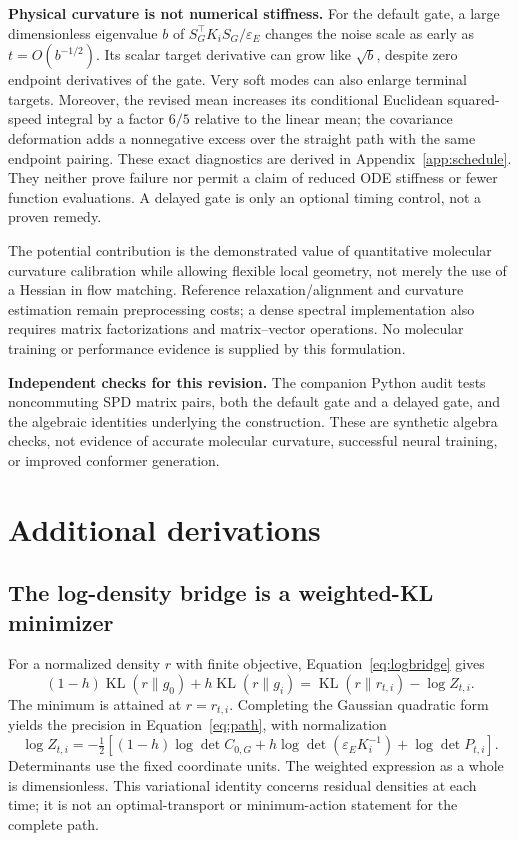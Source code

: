 \documentclass[11pt,letterpaper]{article}
\newcommand{\epsE}{\varepsilon_E}
\newcommand{\KL}{\operatorname{KL}}
\begin{document}
\textbf{Physical curvature is not numerical stiffness.} For the default gate, a large dimensionless eigenvalue $b$ of $S_G^\top K_iS_G/\epsE$ changes the noise scale as early as $t=O(b^{-1/2})$. Its scalar target derivative can grow like $\sqrt b$, despite zero endpoint derivatives of the gate. Very soft modes can also enlarge terminal targets. Moreover, the revised mean increases its conditional Euclidean squared-speed integral by a factor $6/5$ relative to the linear mean; the covariance deformation adds a nonnegative excess over the straight path with the same endpoint pairing. These exact diagnostics are derived in Appendix~\ref{app:schedule}. They neither prove failure nor permit a claim of reduced ODE stiffness or fewer function evaluations. A delayed gate is only an optional timing control, not a proven remedy.

The potential contribution is the demonstrated value of quantitative molecular curvature calibration while allowing flexible local geometry, not merely the use of a Hessian in flow matching. Reference relaxation/alignment and curvature estimation remain preprocessing costs; a dense spectral implementation also requires matrix factorizations and matrix--vector operations. No molecular training or performance evidence is supplied by this formulation.

\textbf{Independent checks for this revision.} The companion Python audit tests noncommuting SPD matrix pairs, both the default gate and a delayed gate, and the algebraic identities underlying the construction. These are synthetic algebra checks, not evidence of accurate molecular curvature, successful neural training, or improved conformer generation.

\appendix
\section{Additional derivations}

\subsection{The log-density bridge is a weighted-KL minimizer}\label{app:kl}
For a normalized density $r$ with finite objective, Equation~\eqref{eq:logbridge} gives
\begin{equation}\label{eq:klproof}
(1-h)\KL(r\|g_0)+h\KL(r\|g_i)
=\KL(r\|r_{t,i})-\log Z_{t,i}.
\end{equation}
The minimum is attained at $r=r_{t,i}$. Completing the Gaussian quadratic form yields the precision in Equation~\eqref{eq:path}, with normalization
\begin{equation}\label{eq:logz}
\log Z_{t,i}=-\tfrac12\left[(1-h)\log\det C_{0,G}
+h\log\det(\epsE K_i^{-1})+\log\det P_{t,i}\right].
\end{equation}
Determinants use the fixed coordinate units. The weighted expression as a whole is dimensionless. This variational identity concerns residual densities at each time; it is not an optimal-transport or minimum-action statement for the complete path.
\end{document}
